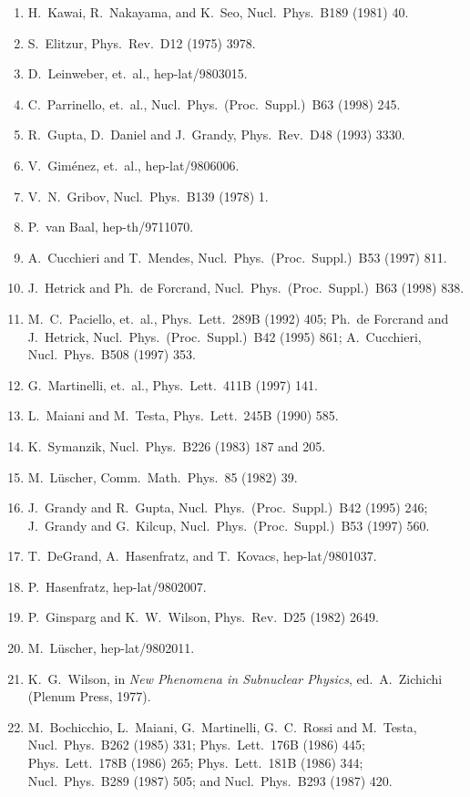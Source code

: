 \begin{enumerate}
\item H.~Kawai, R.~Nakayama, and K.~Seo, Nucl.\ Phys.\ B189 (1981) 40.
\item S.~Elitzur, Phys.\ Rev.\ D12 (1975) 3978.
\item D.~Leinweber, et.\ al., hep-lat/9803015.
\item C.~Parrinello, et.\ al., Nucl.\ Phys.\ (Proc.\ Suppl.)\ B63 (1998) 245.
\item R.~Gupta, D.~Daniel and J.~Grandy, Phys.\ Rev.\ D48 (1993) 3330.
\item V.~Gim\'enez, et.\ al., hep-lat/9806006.
\item V.~N.~Gribov, Nucl.\ Phys.\ B139 (1978) 1.
\item P.~van Baal, hep-th/9711070.
\item A.~Cucchieri and T.~Mendes, Nucl.\ Phys.\ (Proc.\ Suppl.)\ B53 (1997) 811.
\item J.~Hetrick and Ph.~de Forcrand, Nucl.\ Phys.\ (Proc.\ Suppl.)\ B63 (1998) 838.
\item M.~C.~Paciello, et.\ al., Phys.\ Lett.\ 289B (1992) 405; Ph.~de Forcrand and J.~Hetrick, Nucl.\ Phys.\ (Proc.\ Suppl.)\ B42 (1995) 861; A.~Cucchieri, Nucl.\ Phys.\ B508 (1997) 353.
\item G.~Martinelli, et.\ al., Phys.\ Lett.\ 411B (1997) 141.
\item L.~Maiani and M.~Testa, Phys.\ Lett.\ 245B (1990) 585.
\item K.~Symanzik, Nucl.\ Phys.\ B226 (1983) 187 and 205.
\item M.~L\"uscher, Comm.\ Math.\ Phys.\ 85 (1982) 39.
\item J.~Grandy and R.~Gupta, Nucl.\ Phys.\ (Proc.\ Suppl.)\ B42 (1995) 246; J.~Grandy and G.~Kilcup, Nucl.\ Phys.\ (Proc.\ Suppl.)\ B53 (1997) 560.
\item T.~DeGrand, A.~Hasenfratz, and T.~Kovacs, hep-lat/9801037.
\item P.~Hasenfratz, hep-lat/9802007.
\item P.~Ginsparg and K.~W.~Wilson, Phys.\ Rev.\ D25 (1982) 2649.
\item M.~L\"uscher, hep-lat/9802011.
\item K.~G.~Wilson, in \textit{New Phenomena in Subnuclear Physics}, ed.~A.~Zichichi (Plenum Press, 1977).
\item M.~Bochicchio, L.~Maiani, G.~Martinelli, G.~C.~Rossi and M.~Testa, Nucl.\ Phys.\ B262 (1985) 331; Phys.\ Lett.\ 176B (1986) 445; Phys.\ Lett.\ 178B (1986) 265; Phys.\ Lett.\ 181B (1986) 344; Nucl.\ Phys.\ B289 (1987) 505; and Nucl.\ Phys.\ B293 (1987) 420.

\end{enumerate}
